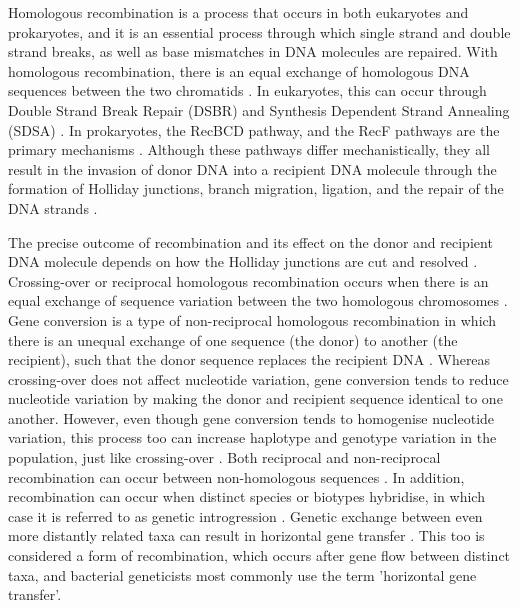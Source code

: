 Homologous recombination is a process that occurs in both eukaryotes and prokaryotes, and it is an essential process through which single strand and double strand breaks, as well as base mismatches in DNA molecules are repaired. With homologous recombination, there is an equal exchange of homologous DNA sequences between the two chromatids \parencite{Lemey2009b}. In eukaryotes, this can occur through Double Strand Break Repair (DSBR) and Synthesis Dependent Strand Annealing (SDSA) \parencite{McMahill2007Synthesis-dependentMeiosis.,Sung2006MechanismFunctions}. In prokaryotes, the RecBCD pathway, and the RecF pathways are the primary mechanisms \parencite{Madigan2012,Smith2012}. Although these pathways differ mechanistically, they all result in the invasion of donor DNA into a recipient DNA molecule through the formation of Holliday junctions, branch migration, ligation, and the repair of the DNA strands \parencite{Alberts2002}.

The precise outcome of recombination and its effect on the donor and recipient DNA molecule depends on how the Holliday junctions are cut and resolved \parencite{Mimitou2009}.
Crossing-over or reciprocal homologous recombination occurs when there is an equal exchange of sequence variation between the two homologous chromosomes \parencite{Grauer2000}.
Gene conversion is a type of non-reciprocal homologous recombination in which there is an unequal exchange of one sequence (the donor) to another (the recipient), such that the donor sequence replaces the recipient DNA \parencite{Grauer2000}.
Whereas crossing-over does not affect nucleotide variation, gene conversion tends to reduce nucleotide variation by making the donor and recipient sequence identical to one another.
However, even though gene conversion tends to homogenise nucleotide variation, this process too can increase haplotype and genotype variation in the population, just like crossing-over \parencite{Spurgin2011}.
Both reciprocal and non-reciprocal recombination can occur between non-homologous sequences \parencite{Lemey2009b}.
In addition, recombination can occur when distinct species or biotypes hybridise, in which case it is referred to as genetic introgression \parencite{McMullan2015a}.
Genetic exchange between even more distantly related taxa can result in horizontal gene transfer \parencite{Eisen2000,Ochman2000}.
This too is considered a form of recombination, which occurs after gene flow between distinct taxa, and bacterial geneticists most commonly use the term 'horizontal gene transfer'.

